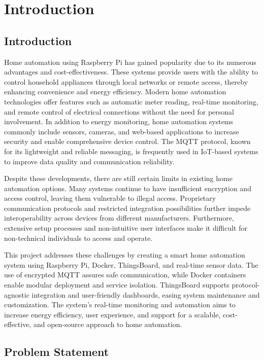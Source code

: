 \documentclass[a4paper,12pt]{report}
\begin{document}
\tableofcontents
\listoffigures
\newpage
\chapter{Introduction}
\section{Introduction}
Home automation using Raspberry Pi has gained popularity due to its numerous advantages and cost-effectiveness. These systems provide users with the ability to control household appliances through local networks or remote access, thereby enhancing convenience and energy efficiency\cite{jain2014raspberry}. Modern home automation technologies offer features such as automatic meter reading, real-time monitoring, and remote control of electrical connections without the need for personal involvement\cite{chaudhari2017smart}. In addition to energy monitoring, home automation systems commonly include sensors, cameras, and web-based applications to increase security and enable comprehensive device control\cite{patchava2015smart}. The MQTT protocol, known for its lightweight and reliable messaging, is frequently used in IoT-based systems to improve data quality and communication reliability\cite{Atmoko_2017}.

Despite these developments, there are still certain limits in existing home automation options. Many systems continue to have insufficient encryption and access control, leaving them vulnerable to illegal access. Proprietary communication protocols and restricted integration possibilities further impede interoperability across devices from different manufacturers. Furthermore, extensive setup processes and non-intuitive user interfaces make it difficult for non-technical individuals to access and operate.

This project addresses these challenges by creating a smart home automation system using Raspberry Pi, Docker, ThingsBoard, and real-time sensor data. The use of encrypted MQTT assures safe communication, while Docker containers enable modular deployment and service isolation. ThingsBoard supports protocol-agnostic integration and user-friendly dashboards, easing system maintenance and customization. The system's real-time monitoring and automation aims to increase energy efficiency, user experience, and support for a scalable, cost-effective, and open-source approach to home automation.

\section{Problem Statement}
\end{document}
